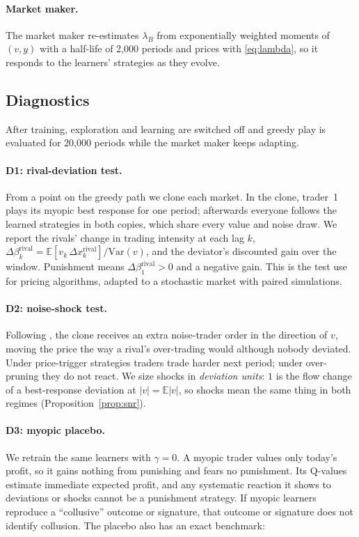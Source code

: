 \paragraph{Market maker.} The market maker re-estimates $\lambda_B$ from
exponentially weighted moments of $(v,y)$ with a half-life of 2{,}000 periods
and prices with \eqref{eq:lambda}, so it responds to the learners' strategies
as they evolve.

\subsection{Diagnostics}

After training, exploration and learning are switched off and greedy play is
evaluated for 20{,}000 periods while the market maker keeps adapting.

\paragraph{D1: rival-deviation test.} From a point on the greedy path we clone
each market. In the clone, trader~1 plays its myopic best response for one
period; afterwards everyone follows the learned strategies in both copies,
which share every value and noise draw. We report the rivals' change in
trading intensity at each lag $k$,
$\Delta\beta^{\mathrm{rival}}_k=\mathbb E[v_k\,\Delta x^{\mathrm{rival}}_k]/\mathrm{Var}(v)$,
and the deviator's discounted gain over the window. Punishment means
$\Delta\beta^{\mathrm{rival}}_1>0$ and a negative gain. This is the test
\citet{calvano2020} use for pricing algorithms, adapted to a stochastic market
with paired simulations.

\paragraph{D2: noise-shock test.} Following \citet{dou2025}, the clone
receives an extra noise-trader order in the direction of $v$, moving the price
the way a rival's over-trading would although nobody deviated. Under
price-trigger strategies traders trade harder next period; under over-pruning
they do not react. We size shocks in \emph{deviation units}: $1$ is the flow
change of a best-response deviation at $|v|=\mathbb E|v|$, so shocks mean the
same thing in both regimes (Proposition~\ref{prop:snr}).

\paragraph{D3: myopic placebo.} We retrain the same learners with $\gamma=0$.
A myopic trader values only today's profit, so it gains nothing from
punishing and fears no punishment. Its Q-values estimate immediate expected
profit, and any systematic reaction it shows to deviations or shocks cannot be
a punishment strategy. If myopic learners reproduce a ``collusive'' outcome or
signature, that outcome or signature does not identify collusion. The placebo
also has an exact benchmark:

